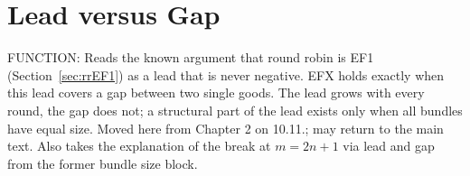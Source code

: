 \chapter{Lead versus Gap}\label{sec:leadgap}

FUNCTION: Reads the known argument that round robin is EF1 (Section~\ref{sec:rrEF1}) as a lead
that is never negative. EFX holds exactly when this lead covers a gap between two single goods.
The lead grows with every round, the gap does not; a structural part of the lead exists only when
all bundles have equal size. Moved here from Chapter 2 on 10.11.; may return to the main text. Also takes the explanation of
the break at $m=2n+1$ via lead and gap from the former bundle size block.
